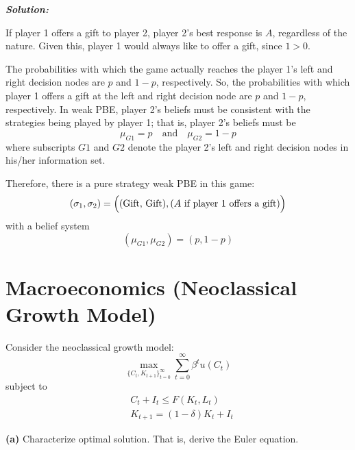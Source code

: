 \documentclass[12pt, letterpaper]{article}
\begin{document}
\begin{shaded}
\noindent\textbf{\textit{Solution:}}\par
If player 1 offers a gift to player 2, player 2's best response is $A$, regardless of the nature. Given this, player 1 would always like to offer a gift, since $1 > 0$.

The probabilities with which the game actually reaches the player 1's left and right decision nodes are $p$ and $1-p$, respectively. So, the probabilities with which player 1 offers a gift at the left and right decision node are $p$ and $1-p$, respectively. In weak PBE, player 2's beliefs must be consistent with the strategies being played by player 1; that is, player 2's beliefs must be
\begin{equation*}
    \mu_{G1} = p \quad \text{and} \quad \mu_{G2} = 1-p
\end{equation*}
where subscripts $G1$ and $G2$ denote the player 2's left and right decision nodes in his/her information set.

Therefore, there is a pure strategy weak PBE in this game:
\begin{equation*}
    (\sigma_1, \sigma_2) = \Bigl( (\text{Gift, Gift}), (\text{$A$ if player 1 offers a gift}) \Bigr)
\end{equation*}
with a belief system
\begin{equation*}
    (\mu_{G1}, \mu_{G2}) = (p, 1-p)
\end{equation*}
\end{shaded}




\section{Macroeconomics (Neoclassical Growth Model)}
Consider the neoclassical growth model:
\begin{equation*}
    \max_{\{C_t, K_{t+1}\}_{t=0}^{\infty}} \sum_{t=0}^{\infty} \beta^t u(C_t)
\end{equation*}
subject to
\begin{align}
    & C_t + I_t \leq F(K_t, L_t) \label{eq:PS2_neo_BC1} \\
    & K_{t+1} = (1-\delta) K_t + I_t \label{eq:PS2_neo_BC2}
\end{align}

\noindent\textbf{(a)} Characterize optimal solution. That is, derive the Euler equation.
\end{document}
